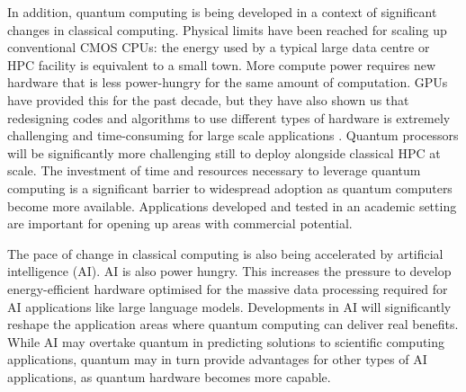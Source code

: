 \documentclass[10pt]{iopart}
\begin{document}
In addition, quantum computing is being developed in a context of significant changes in classical computing.  Physical limits have been reached for scaling up conventional CMOS CPUs: the energy used by a typical large data centre or HPC facility is equivalent to a small town. More compute power requires new hardware that is less power-hungry for the same amount of computation.  GPUs have provided this for the past decade, but they have also shown us that redesigning codes and algorithms to use different types of hardware is extremely challenging and time-consuming for large scale applications \cite{Betcke2022}.  Quantum processors will be significantly more challenging still to deploy alongside classical HPC at scale.  The investment of time and resources necessary to leverage quantum computing is a significant barrier to widespread adoption as quantum computers become more available.  Applications developed and tested in an academic setting are important for opening up areas with commercial potential.

The pace of change in classical computing is also being accelerated by artificial intelligence (AI).  AI is also power hungry. This increases the pressure to develop energy-efficient hardware optimised for the massive data processing required for AI applications like large language models.  Developments in AI will significantly reshape the application areas where quantum computing can deliver real benefits.  While AI may overtake quantum in predicting solutions to scientific computing applications, quantum may in turn provide advantages \cite{Dunjko2018, Cerezo2022} for other types of AI applications, as quantum hardware becomes more capable.
\end{document}
